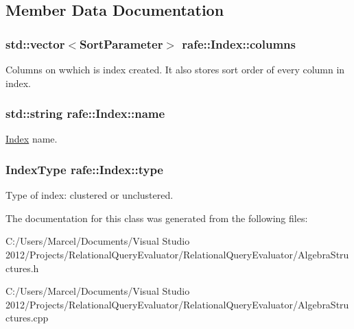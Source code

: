\subsection{Member Data Documentation}
\hypertarget{classrafe_1_1_index_a74cf2aef59f22a7ef0175b59908bd3b2}{
\subsubsection[{columns}]{\setlength{\rightskip}{0pt plus 5cm}std\+::vector$<${\bf Sort\+Parameter}$>$ rafe\+::\+Index\+::columns}}\label{classrafe_1_1_index_a74cf2aef59f22a7ef0175b59908bd3b2}
Columns on wwhich is index created. It also stores sort order of every column in index. \hypertarget{classrafe_1_1_index_adfba6ba7d75003d44df8b92d6e232346}{
\subsubsection[{name}]{\setlength{\rightskip}{0pt plus 5cm}std\+::string rafe\+::\+Index\+::name}}\label{classrafe_1_1_index_adfba6ba7d75003d44df8b92d6e232346}
\hyperlink{classrafe_1_1_index}{Index} name. \hypertarget{classrafe_1_1_index_ab51a314af4e6fcda600f72b2ca5a6851}{
\subsubsection[{type}]{\setlength{\rightskip}{0pt plus 5cm}Index\+Type rafe\+::\+Index\+::type}}\label{classrafe_1_1_index_ab51a314af4e6fcda600f72b2ca5a6851}
Type of index\+: clustered or unclustered. 

The documentation for this class was generated from the following files\+:\begin{DoxyCompactItemize}
\item 
C\+:/\+Users/\+Marcel/\+Documents/\+Visual Studio 2012/\+Projects/\+Relational\+Query\+Evaluator/\+Relational\+Query\+Evaluator/Algebra\+Structures.\+h\item 
C\+:/\+Users/\+Marcel/\+Documents/\+Visual Studio 2012/\+Projects/\+Relational\+Query\+Evaluator/\+Relational\+Query\+Evaluator/Algebra\+Structures.\+cpp\end{DoxyCompactItemize}
